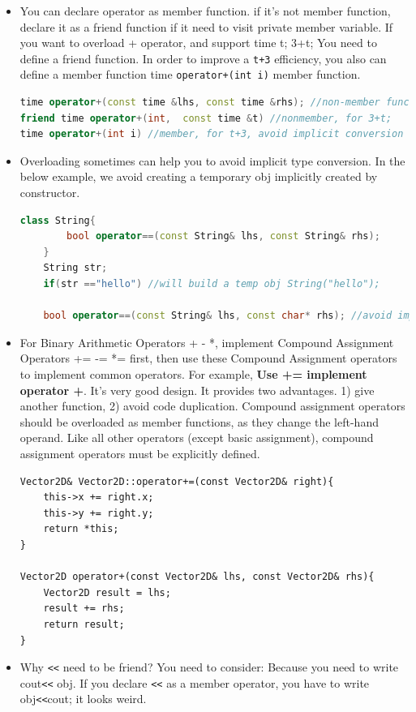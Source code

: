 \documentclass[a4paper,11pt,twoside]{book}
\begin{document}
\begin{itemize}
	
	\item You can declare operator as member function. if it's not member function, declare it as a friend function if it need to visit private member variable. If you want to overload + operator, and support time t; 3+t;   You need to define a friend function. In order to improve a \texttt{t+3} efficiency, you also can define a member function time \texttt{operator+(int i)} member function.
\begin{lstlisting}[frame=single, language=c++]
time operator+(const time &lhs, const time &rhs); //non-member function
friend time operator+(int,  const time &t) //nonmember, for 3+t;
time operator+(int i) //member, for t+3, avoid implicit conversion from 3 to t
\end{lstlisting}

	\item Overloading sometimes can help you to avoid implicit type conversion. In the below example, we avoid creating a temporary obj implicitly created by constructor.

\begin{lstlisting}[frame=single, language=c++]
	class String{
		bool operator==(const String& lhs, const String& rhs);
	}
	String str;
	if(str =="hello") //will build a temp obj String("hello");
	
	bool operator==(const String& lhs, const char* rhs); //avoid implicit conversion.	
\end{lstlisting}

	
	\item For Binary Arithmetic Operators + - *, implement Compound Assignment Operators += -= *= first, then use these Compound Assignment operators to implement common operators. For example, \textbf{Use += implement operator +}. It's very good design. It provides two advantages. 1) give another function, 2) avoid code duplication. Compound assignment operators should be overloaded as member functions, as they change the left-hand operand. Like all other operators (except basic assignment), compound assignment operators must be explicitly defined. 
\begin{lstlisting}[numbers=none]
Vector2D& Vector2D::operator+=(const Vector2D& right){
	this->x += right.x;
	this->y += right.y;
	return *this;
}

Vector2D operator+(const Vector2D& lhs, const Vector2D& rhs){
	Vector2D result = lhs;
	result += rhs;
	return result;
}
\end{lstlisting}
	
	\item Why \verb=<<= need to be friend? You need to consider:  Because you need to write cout\verb=<<= obj. If you declare \verb=<<= as a member operator, you have to write obj\verb=<<=cout; it looks weird.
	

\end{itemize}
\end{document}
